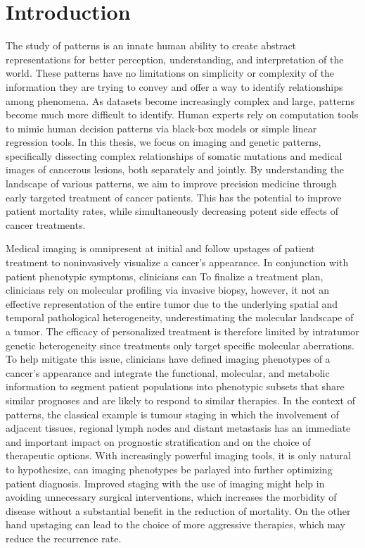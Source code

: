 \chapter{Introduction}
\label{ch:intro}

The study of patterns is an innate human ability to create abstract representations for better perception, understanding, and interpretation of the world.  These patterns have no limitations on simplicity or complexity of the information they are trying to convey and offer a way to identify relationships among phenomena.  As datasets become increasingly complex and large, patterns become much more difficult to identify.  Human experts rely on computation tools to mimic human decision patterns via black-box models or simple linear regression tools.  In this thesis, we focus on imaging and genetic patterns, specifically dissecting complex relationships of somatic mutations and medical images of cancerous lesions, both separately and jointly.  By understanding the landscape of various patterns, we aim to improve precision medicine through early targeted treatment of cancer patients.  This has the potential to improve patient mortality rates, while simultaneously decreasing potent side effects of cancer treatments.

Medical imaging is omnipresent at initial and follow upstages of patient treatment to noninvasively visualize a cancer’s appearance.  In conjunction with patient phenotypic symptoms, clinicians can     To finalize a treatment plan, clinicians rely on molecular profiling via invasive biopsy, however, it not an effective representation of the entire tumor due to the underlying spatial and temporal pathological heterogeneity, underestimating the molecular landscape of a tumor.   The efficacy of personalized treatment is therefore limited by intratumor genetic heterogeneity since treatments only target specific molecular aberrations.  To help mitigate this issue, clinicians have defined imaging phenotypes of a cancer's appearance and integrate the functional, molecular, and metabolic information to segment patient populations into phenotypic subsets that share similar prognoses and are likely to respond to similar therapies.  In the context of patterns, the classical example is tumour staging in which the involvement of adjacent tissues, regional lymph nodes and distant metastasis has an immediate and important impact on prognostic stratification and on the choice of therapeutic options. With increasingly powerful imaging tools, it is only natural to hypothesize, can imaging phenotypes be parlayed into further optimizing patient diagnosis.  Improved staging with the use of imaging might help in avoiding unnecessary surgical interventions, which increases the morbidity of disease without a substantial benefit in the reduction of mortality. On the other hand upstaging can lead to the choice of more aggressive therapies, which may reduce the recurrence rate.    

